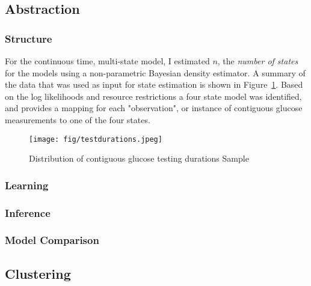 \subsection{Abstraction}

\subsubsection{Structure}
For the continuous time, multi-state model, I estimated $n$, the \emph{number of states} for the models using a non-parametric Bayesian density estimator.  A summary of the data that was used as input for state estimation is shown in Figure~\ref{testdurations}. Based on the log likelihoods and resource restrictions a four state model was identified, and provides a mapping for each "observation", or instance of contiguous glucose measurements to one of the four states.

\begin{figure}[ht]
  \centering
  \texttt{[image: fig/testdurations.jpeg]}\\
  \caption{Distribution of contiguous glucose testing durations Sample}\label{testdurations}
\end{figure}


\subsubsection{Learning}
\subsubsection{Inference}
\subsubsection{Model Comparison}
\subsection{Clustering}

